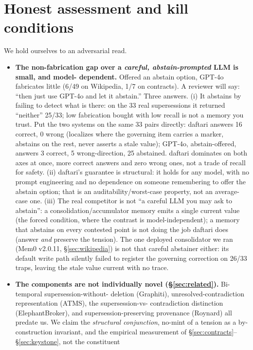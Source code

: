 \documentclass[11pt]{article}
\begin{document}
\section{Honest assessment and kill conditions}
\label{sec:honest}

We hold ourselves to an adversarial read.

\begin{itemize}
\item \textbf{The non-fabrication gap over a \emph{careful, abstain-prompted} LLM is small, and model-
  dependent.} Offered an abstain option, GPT-4o fabricates little (6/49 on Wikipedia, 1/7 on
  contracts). A reviewer will say: ``then just use GPT-4o and let it abstain.'' Three answers.
  (i) It abstains by failing to detect what is there: on the 33 real supersessions it
  returned ``neither'' 25/33; low fabrication bought with low recall is not a memory you trust.
  Put the two systems on the same 33 pairs directly: daftari answers 16 correct, 0 wrong
  (localizes where the governing item carries a marker, abstains on the rest, never asserts a
  stale value); GPT-4o, abstain-offered, answers 3 correct, 5 wrong-direction, 25
  abstained. daftari dominates on both axes at once, more correct answers and zero wrong
  ones, not a trade of recall for safety.
  (ii) daftari's guarantee is structural: it holds for any model, with no prompt
  engineering and no dependence on someone remembering to offer the abstain option; that is
  an auditability/worst-case property, not an average-case one. (iii) The real competitor
  is not ``a careful LLM you may ask to abstain'': a consolidation/accumulator memory emits
  a single current value (the forced condition, where the contrast is model-independent); a
  memory that abstains on every contested point is not doing the job daftari does (answer
  \emph{and} preserve the tension). The one deployed consolidator we ran (Mem0 v2.0.11, \S\ref{sec:wikipedia}) is
  not that careful abstainer either: its default write path silently failed to register the
  governing correction on 26/33 traps, leaving the stale value current with no trace.
\item \textbf{The components are not individually novel (\S\ref{sec:related}).} Bi-temporal supersession-without-
  deletion (Graphiti), unresolved-contradiction representation (ATMS), the supersession-vs-
  contradiction distinction (ElephantBroker), and supersession-preserving provenance (Roynard)
  all predate us. We claim the \emph{structural conjunction}, no-mint of a tension as a
  by-construction invariant, and the empirical measurement of \S\ref{sec:contracts}--\S\ref{sec:keystone}, not the constituent

\end{itemize}
\end{document}
